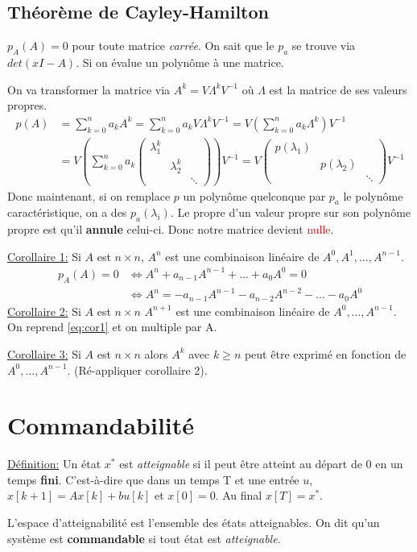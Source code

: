 \documentclass{report}
\begin{document}
\subsection{Théorème de Cayley-Hamilton}
$p_A (A) = 0$ pour toute matrice \textit{carrée}. On sait que le $p_a$ se trouve via $det(xI - A)$. Si on évalue un polynôme à une matrice. \par 
On va transformer la matrice via $A^{k} = V \Lambda^k V^{-1}$ où $\Lambda$ est la matrice de ses valeurs propres.
\begin{align*}
p(A) &= \sum_{k=0}^n a_k A^k = \sum_{k=0}^n a_k V \Lambda^k V^{-1}
= V \left( \sum_{k=0}^n a_k \Lambda^k \right) V^{-1}\\
&= V \left(  \sum_{k=0}^n a_k \begin{pmatrix}
\lambda_1^k & & \\
 & \lambda_2^k & \\
& & \ddots
\end{pmatrix} \right) V^{-1} = V \begin{pmatrix}
p(\lambda_1) & & \\
 & p(\lambda_2) & \\
 & & \ddots
\end{pmatrix} V^{-1}
\end{align*}
Donc maintenant, si on remplace $p$ un polynôme quelconque par $p_a$ le polynôme caractéristique, on a des $p_a(\lambda_i)$. Le propre d'un valeur propre sur son polynôme propre est qu'il \textbf{annule} celui-ci. Donc notre matrice devient \textcolor{red}{nulle}.\par \noindent
\underline{Corollaire 1:} Si $A$ est $n \times n$, $A^n$ est une combinaison linéaire de $A^0, A^1, ... , A^{n-1}$.
\begin{align}
p_A (A) = 0 & \Leftrightarrow A^n + a_{n-1}A^{n-1} + ... + a_0 A^0 = 0\\
& \Leftrightarrow A^n = -a_{n-1} A^{n-1} - a_{n-2} A^{n-2} - ... - a_0 A^0 \label{eq:cor1}
\end{align}
\underline{Corollaire 2:} Si $A$ est $n \times n$ $A^{n+1}$ est une combinaison linéaire de $A^0, ..., A^{n-1}$. On reprend \ref{eq:cor1} et on multiple par A. \par  \noindent
\underline{Corollaire 3:} Si $A$ est $n \times n$ alors $A^k$ avec $k \geqslant n$ peut être exprimé en fonction de $A^0, ..., A^{n-1}$. (Ré-appliquer corollaire 2).

\section{Commandabilité}
\noindent 
\underline{Définition:} Un état $x^{\ast}$ est \textit{atteignable} si il peut être atteint au départ de 0 en un temps \textbf{fini}. C'est-à-dire que dans un temps T et une entrée $u$, $x[k+1] = Ax[k] + bu[k]$ et $x[0] = 0$. Au final $x[T] = x^{\ast}$.\par
L'espace d'atteignabilité est l'ensemble des états atteignables. On dit qu'un système est \textbf{commandable} si tout état est \textit{atteignable}.
\end{document}
